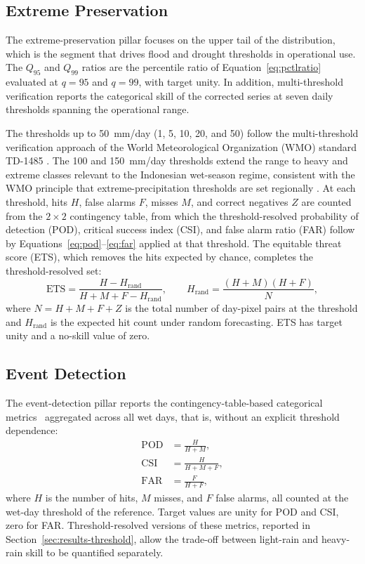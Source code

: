 \subsection{Extreme Preservation}

The extreme-preservation pillar focuses on the upper tail of the
distribution, which is the segment that drives flood and drought
thresholds in operational use. The $Q_{95}$ and $Q_{99}$ ratios
are the percentile ratio of Equation~\eqref{eq:pctlratio}
evaluated at $q = 95$ and $q = 99$, with target unity. In
addition, multi-threshold verification reports the categorical
skill of the corrected series at seven daily thresholds spanning
the operational range.

The thresholds up to 50~mm/day (1, 5, 10,
20, and 50) follow the multi-threshold verification approach of
the World Meteorological Organization (WMO) standard TD-1485
\citep{ref:wmo1485}. The 100 and 150~mm/day thresholds extend the range to
heavy and extreme classes relevant to the Indonesian wet-season
regime, consistent with the WMO principle that
extreme-precipitation thresholds are set regionally
\citep{ref:wmo1310}. At each threshold, hits $H$, false alarms
$F$, misses $M$, and correct negatives $Z$ are counted from the
$2 \times 2$ contingency table, from which the threshold-resolved
probability of detection (POD), critical success index (CSI), and
false alarm ratio (FAR) follow by Equations~\eqref{eq:pod}--\eqref{eq:far}
applied at that threshold. The equitable threat score (ETS),
which removes the hits expected by chance, completes the
threshold-resolved set:
\begin{equation}
\text{ETS} = \frac{H - H_{\text{rand}}}{H + M + F - H_{\text{rand}}},
\qquad
H_{\text{rand}} = \frac{(H + M)(H + F)}{N},
\label{eq:ets}
\end{equation}
where $N = H + M + F + Z$ is the total number of day-pixel pairs
at the threshold and $H_{\text{rand}}$ is the expected hit count
under random forecasting. ETS has target unity and a no-skill
value of zero.

\subsection{Event Detection}

The event-detection pillar reports the contingency-table-based
categorical metrics~\citep{ref:ebert2007, ref:wilks2020} aggregated across all wet days, that is,
without an explicit threshold dependence:
\begin{align}
\text{POD} &= \frac{H}{H + M}, \label{eq:pod} \\
\text{CSI} &= \frac{H}{H + M + F}, \label{eq:csi} \\
\text{FAR} &= \frac{F}{H + F}, \label{eq:far}
\end{align}
where $H$ is the number of hits, $M$ misses, and $F$ false
alarms, all counted at the wet-day threshold of the reference.
Target values are unity for POD and CSI, zero for FAR.
Threshold-resolved versions of these metrics, reported in
Section~\ref{sec:results-threshold}, allow the trade-off between
light-rain and heavy-rain skill to be quantified separately.

